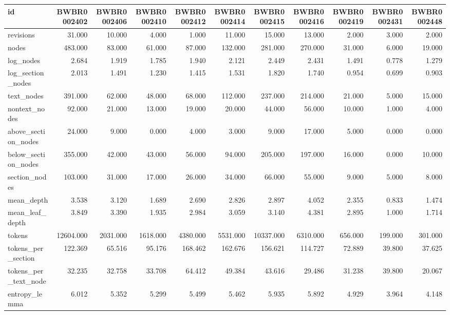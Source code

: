 \begin{tabular}{lrrrrrrrrrr}
\toprule
id & BWBR0002402 & BWBR0002406 & BWBR0002410 & BWBR0002412 & BWBR0002414 & BWBR0002415 & BWBR0002416 & BWBR0002419 & BWBR0002431 & BWBR0002448 \\
\midrule
revisions & 31.000 & 10.000 & 4.000 & 1.000 & 11.000 & 15.000 & 13.000 & 2.000 & 3.000 & 2.000 \\
\cline{1-11}
nodes & 483.000 & 83.000 & 61.000 & 87.000 & 132.000 & 281.000 & 270.000 & 31.000 & 6.000 & 19.000 \\
\cline{1-11}
log\_nodes & 2.684 & 1.919 & 1.785 & 1.940 & 2.121 & 2.449 & 2.431 & 1.491 & 0.778 & 1.279 \\
\cline{1-11}
log\_section\_nodes & 2.013 & 1.491 & 1.230 & 1.415 & 1.531 & 1.820 & 1.740 & 0.954 & 0.699 & 0.903 \\
\cline{1-11}
text\_nodes & 391.000 & 62.000 & 48.000 & 68.000 & 112.000 & 237.000 & 214.000 & 21.000 & 5.000 & 15.000 \\
\cline{1-11}
nontext\_nodes & 92.000 & 21.000 & 13.000 & 19.000 & 20.000 & 44.000 & 56.000 & 10.000 & 1.000 & 4.000 \\
\cline{1-11}
above\_section\_nodes & 24.000 & 9.000 & 0.000 & 4.000 & 3.000 & 9.000 & 17.000 & 5.000 & 0.000 & 0.000 \\
\cline{1-11}
below\_section\_nodes & 355.000 & 42.000 & 43.000 & 56.000 & 94.000 & 205.000 & 197.000 & 16.000 & 0.000 & 10.000 \\
\cline{1-11}
section\_nodes & 103.000 & 31.000 & 17.000 & 26.000 & 34.000 & 66.000 & 55.000 & 9.000 & 5.000 & 8.000 \\
\cline{1-11}
mean\_depth & 3.538 & 3.120 & 1.689 & 2.690 & 2.826 & 2.897 & 4.052 & 2.355 & 0.833 & 1.474 \\
\cline{1-11}
mean\_leaf\_depth & 3.849 & 3.390 & 1.935 & 2.984 & 3.059 & 3.140 & 4.381 & 2.895 & 1.000 & 1.714 \\
\cline{1-11}
tokens & 12604.000 & 2031.000 & 1618.000 & 4380.000 & 5531.000 & 10337.000 & 6310.000 & 656.000 & 199.000 & 301.000 \\
\cline{1-11}
tokens\_per\_section & 122.369 & 65.516 & 95.176 & 168.462 & 162.676 & 156.621 & 114.727 & 72.889 & 39.800 & 37.625 \\
\cline{1-11}
tokens\_per\_text\_node & 32.235 & 32.758 & 33.708 & 64.412 & 49.384 & 43.616 & 29.486 & 31.238 & 39.800 & 20.067 \\
\cline{1-11}
entropy\_lemma & 6.012 & 5.352 & 5.299 & 5.499 & 5.462 & 5.935 & 5.892 & 4.929 & 3.964 & 4.148 \\

\end{tabular}

